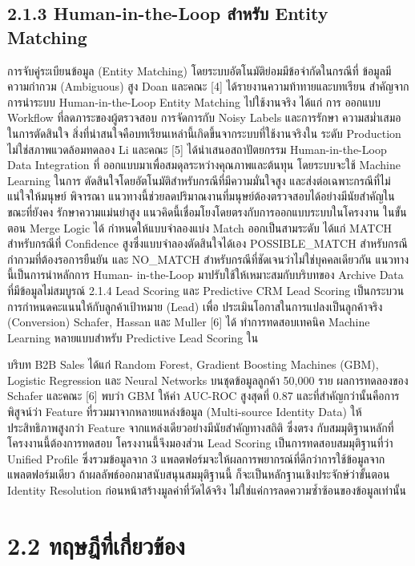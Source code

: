 \documentclass[12pt,a4paper]{report}
\begin{document}
\subsection*{2.1.3 Human-in-the-Loop สำหรับ Entity Matching}
การจับคู่ระเบียนข้อมูล (Entity Matching) โดยระบบอัตโนมัติย่อมมีข้อจำกัดในกรณีที่ ข้อมูลมีความกำกวม (Ambiguous) สูง Doan และคณะ [4] ได้รายงานความท้าทายและบทเรียน สำคัญจากการนำระบบ Human-in-the-Loop Entity Matching ไปใช้งานจริง ได้แก่ การ ออกแบบ Workflow ที่ลดภาระของผู้ตรวจสอบ การจัดการกับ Noisy Labels และการรักษา ความสม่ำเสมอในการตัดสินใจ สิ่งที่น่าสนใจคือบทเรียนเหล่านี้เกิดขึ้นจากระบบที่ใช้งานจริงใน ระดับ Production ไม่ใช่สภาพแวดล้อมทดลอง Li และคณะ [5] ได้นำเสนอสถาปัตยกรรม Human-in-the-Loop Data Integration ที่ ออกแบบมาเพื่อสมดุลระหว่างคุณภาพและต้นทุน โดยระบบจะใช้ Machine Learning ในการ ตัดสินใจโดยอัตโนมัติสำหรับกรณีที่มีความมั่นใจสูง และส่งต่อเฉพาะกรณีที่ไม่แน่ใจให้มนุษย์ พิจารณา แนวทางนี้ช่วยลดปริมาณงานที่มนุษย์ต้องตรวจสอบได้อย่างมีนัยสำคัญในขณะที่ยังคง รักษาความแม่นยำสูง แนวคิดนี้เชื่อมโยงโดยตรงกับการออกแบบระบบในโครงงาน ในขั้นตอน Merge Logic ได้ กำหนดให้แบบจำลองแบ่ง Match ออกเป็นสามระดับ ได้แก่ MATCH สำหรับกรณีที่ Confidence สูงซึ่งแบบจำลองตัดสินใจได้เอง POSSIBLE\_MATCH สำหรับกรณีกำกวมที่ต้องรอการยืนยัน และ NO\_MATCH สำหรับกรณีที่ชัดเจนว่าไม่ใช่บุคคลเดียวกัน แนวทางนี้เป็นการนำหลักการ Human- in-the-Loop มาปรับใช้ให้เหมาะสมกับบริบทของ Archive Data ที่มีข้อมูลไม่สมบูรณ์ 2.1.4 Lead Scoring และ Predictive CRM Lead Scoring เป็นกระบวนการกำหนดคะแนนให้กับลูกค้าเป้าหมาย (Lead) เพื่อ ประเมินโอกาสในการแปลงเป็นลูกค้าจริง (Conversion) Schafer, Hassan และ Muller [6] ได้ ทำการทดสอบเทคนิค Machine Learning หลายแบบสำหรับ Predictive Lead Scoring ใน\par
\clearpage
บริบท B2B Sales ได้แก่ Random Forest, Gradient Boosting Machines (GBM), Logistic Regression และ Neural Networks บนชุดข้อมูลลูกค้า 50,000 ราย ผลการทดลองของ Schafer และคณะ [6] พบว่า GBM ให้ค่า AUC-ROC สูงสุดที่ 0.87 และที่สำคัญกว่านั้นคือการพิสูจน์ว่า Feature ที่รวมมาจากหลายแหล่งข้อมูล (Multi-source Identity Data) ให้ประสิทธิภาพสูงกว่า Feature จากแหล่งเดียวอย่างมีนัยสำคัญทางสถิติ ซึ่งตรง กับสมมุติฐานหลักที่โครงงานนี้ต้องการทดสอบ โครงงานนี้จึงมองส่วน Lead Scoring เป็นการทดสอบสมมุติฐานที่ว่า Unified Profile ซึ่งรวมข้อมูลจาก 3 แพลตฟอร์มจะให้ผลการพยากรณ์ที่ดีกว่าการใช้ข้อมูลจากแพลตฟอร์มเดียว ถ้าผลลัพธ์ออกมาสนับสนุนสมมุติฐานนี้ ก็จะเป็นหลักฐานเชิงประจักษ์ว่าขั้นตอน Identity Resolution ก่อนหน้าสร้างมูลค่าที่วัดได้จริง ไม่ใช่แค่การลดความซ้ำซ้อนของข้อมูลเท่านั้น\par
\section*{2.2 ทฤษฎีที่เกี่ยวข้อง}
\end{document}
